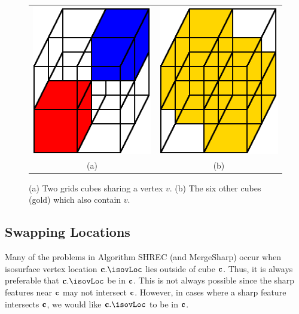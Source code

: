 \begin{figure}[t]
\centering

\begin{tabular}{cc}
\includegraphics[width=0.4\linewidth]{images/shared_vertex.eps} \qquad &
\qquad
\includegraphics[width=0.4\linewidth]{images/shared_vertex_B.eps} \\
(a) & (b)
\end{tabular}

\caption{(a) Two grids cubes sharing a vertex $v$.
(b) The six other cubes (gold) which also contain $v$.
}
\label{fig:shared_vertex}
\end{figure}

\subsection{Swapping Locations}

Many of the problems in Algorithm SHREC (and MergeSharp) occur when
isosurface vertex location $\cb.\isovLoc$ lies outside of cube $\mathbf{c}$.
Thus, it is always preferable that $\cb.\isovLoc$ be in $\mathbf{c}$.
This is not always possible since the sharp features near $\mathbf{c}$
may not intersect $\mathbf{c}$.
However, in cases where a sharp feature intersects $\mathbf{c}$,
we would like $\cb.\isovLoc$ to be in $\mathbf{c}$.

